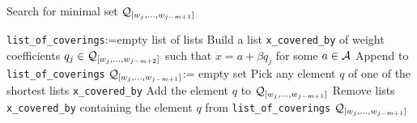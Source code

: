 \begin{algorithm}
  \caption{Search for minimal set $\mathcal{Q}_{[w_j,\dots, w_{j-m+1}]}$ }
    \label{alg:minimalSet}
  \begin{algorithmic}[1]
    \STATE \verb+list_of_coverings+:=empty list of lists
        \STATE Build a list \verb+x_covered_by+ of weight coefficients $q_j \in \mathcal{Q}_{[w_j,\dots, w_{j-m+2}]}$ such that $x=a+ \beta q_j$ for some $a\in\mathcal{A}$
        \STATE Append  to \verb+list_of_coverings+
    \ENDFOR
    \STATE $\mathcal{Q}_{[w_j,\dots, w_{j-m+1}]}$:= empty set
        \STATE Pick any element $q$ of one of the shortest lists \verb+x_covered_by+
        \STATE Add the element $q$ to $\mathcal{Q}_{[w_j,\dots, w_{j-m+1}]}$
        \STATE Remove lists \verb+x_covered_by+ containing the element $q$ from \verb+list_of_coverings+
    \ENDWHILE
    \RETURN $\mathcal{Q}_{[w_j,\dots, w_{j-m+1}]}$
  \end{algorithmic}
\end{algorithm}

  
